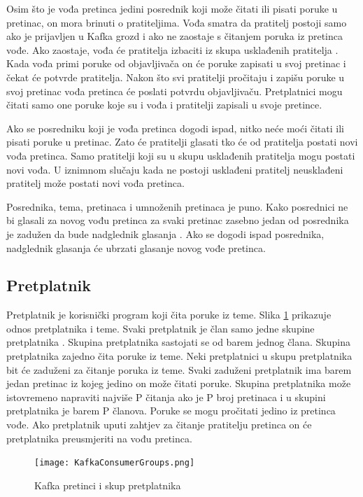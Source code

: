 \documentclass[utf8, diplomski, lmodern, numeric]{fer}
\begin{document}
Osim što je vođa pretinca jedini posrednik koji može čitati ili pisati poruke u pretinac, on mora brinuti o pratiteljima. Vođa smatra da pratitelj postoji samo ako je prijavljen u Kafka grozd i ako ne zaostaje s čitanjem poruka iz pretinca vođe. Ako zaostaje, vođa će pratitelja izbaciti iz skupa usklađenih pratitelja . Kada vođa primi poruke od objavljivača on će poruke zapisati u svoj pretinac i čekat će potvrde pratitelja. Nakon što svi pratitelji pročitaju i zapišu poruke u svoj pretinac vođa pretinca će poslati potvrdu objavljivaču. Pretplatnici mogu čitati samo one poruke koje su i vođa i pratitelji zapisali u svoje pretince.

Ako se posredniku koji je vođa pretinca dogodi ispad, nitko neće moći čitati ili pisati poruke u pretinac. Zato će pratitelji glasati tko će od pratitelja postati novi vođa pretinca. Samo pratitelji koji su u skupu usklađenih pratitelja mogu postati novi vođa. U iznimnom slučaju kada ne postoji usklađeni pratitelj neusklađeni pratitelj može postati novi vođa pretinca.

Posrednika, tema, pretinaca i umnoženih pretinaca je puno. Kako posrednici ne bi glasali za novog vođu pretinca za svaki pretinac zasebno jedan od posrednika je zadužen da bude nadglednik glasanja . Ako se dogodi ispad posrednika, nadglednik glasanja će ubrzati glasanje novog vođe pretinca.

\subsection{Pretplatnik}

Pretplatnik  je korisnički program koji čita poruke iz teme. Slika \ref{fig:kafka-consumer-group} prikazuje odnos pretplatnika i teme. Svaki pretplatnik je član samo jedne skupine pretplatnika . Skupina pretplatnika sastojati se od barem jednog člana. Skupina pretplatnika zajedno čita poruke iz teme. Neki pretplatnici u skupu pretplatnika bit će zaduženi za čitanje poruka iz teme. Svaki zaduženi pretplatnik ima barem jedan pretinac iz kojeg jedino on može čitati poruke. Skupina pretplatnika može istovremeno napraviti najviše P čitanja ako je P broj pretinaca i u skupini pretplatnika je barem P članova. Poruke se mogu pročitati jedino iz pretinca vođe. Ako pretplatnik uputi zahtjev za čitanje pratitelju pretinca on će pretplatnika preusmjeriti na vođu pretinca.

\begin{figure}[H]
    \centering
    \texttt{[image: KafkaConsumerGroups.png]}
    \caption{Kafka pretinci i skup pretplatnika}
    \label{fig:kafka-consumer-group}
\end{figure}
\end{document}
